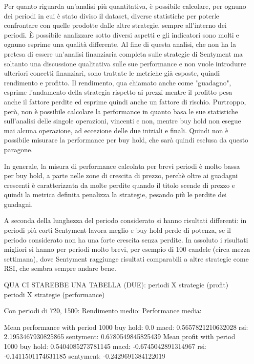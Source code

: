 \documentclass[a4paper,12pt]{report}
\begin{document}
\begin{fig}
Per quanto riguarda un'analisi più quantitativa, è possibile calcolare, per ognuno dei periodi in cui è stato diviso il dataset, diverse statistiche per poterle confrontare con quelle prodotte dalle altre strategie, sempre all'interno dei periodi. È possibile analizzare sotto diversi aspetti e gli indicatori sono molti e ognuno esprime una qualità differente.
Al fine di questa analisi, che non ha la pretesa di essere un'analisi finanziaria completa sulle strategie di Sentyment ma soltanto una discussione qualitativa sulle sue performance e non vuole introdurre ulteriori concetti finanziari, sono trattate le metriche già esposte, quindi rendimento e profitto. Il rendimento, qua chiamato anche come "guadagno", esprime l'andamento della strategia rispetto ai prezzi mentre il profitto pesa anche il fattore perdite ed esprime quindi anche un fattore di rischio. Purtroppo, però, non è possibile calcolare la performance in quanto basa le sue statistiche sull'analisi delle singole operazioni, vincenti e non, mentre buy hold non esegue mai alcuna operazione, ad eccezione delle due iniziali e finali. Quindi non è possibile misurare la performance per buy hold, che sarà quindi esclusa da questo paragone.

In generale, la misura di performance calcolata per brevi periodi è molto bassa per buy hold, a parte nelle zone di crescita di prezzo, perchè oltre ai guadagni crescenti è caratterizzata da molte perdite quando il titolo scende di prezzo e quindi la metrica definita penalizza la strategie, pesando più le perdite dei guadagni. 

A seconda della lunghezza del periodo considerato si hanno risultati differenti: in periodi più corti Sentyment lavora meglio e buy hold perde di potenza, se il periodo considerato non ha una forte crescita senza perdite. In assoluto i risultati migliori si hanno per periodi molto brevi, per esempio di 100 candele (circa mezza settimana), dove Sentyment raggiunge risultati comparabili a altre strategie come RSI, che sembra sempre andare bene.

QUA CI STAREBBE UNA TABELLA (DUE): periodi X strategie (profit)
									periodi X strategie (performance)

Con periodi di 720, 1500: 
Rendimento medio:
Performance media:

Mean performance with period 1000
buy hold: 0.0
macd: 0.5657821210632028
rsi: 2.1953467930825865
sentyment: 0.6780549845825439
Mean profit with period 1000
buy hold: 0.5404085273781145
macd: -0.6745042891314967
rsi: -0.1411501174631185
sentyment: -0.2429691384122019


\end{fig}
\end{document}
